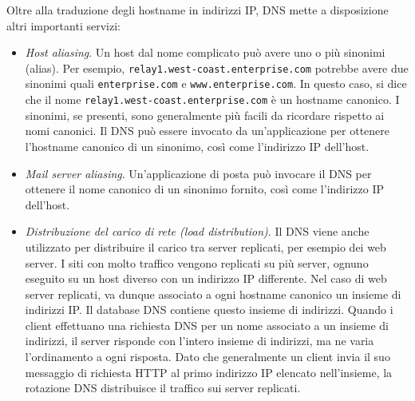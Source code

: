 Oltre alla traduzione degli hostname in indirizzi IP, DNS mette a disposizione altri
importanti servizi:
\begin{itemize}
    \item \textit{Host aliasing}. Un host dal nome complicato può avere uno o più sinonimi (alias). Per esempio, \verb|relay1.west-coast.enterprise.com| potrebbe avere due sinonimi quali \verb|enterprise.com| e \verb|www.enterprise.com|. In questo caso, si dice che il nome \verb|relay1.west-coast.enterprise.com| è un hostname canonico. I sinonimi, se presenti, sono generalmente più facili da ricordare rispetto ai nomi canonici. Il DNS può essere invocato da un'applicazione per ottenere l'hostname canonico di un sinonimo, così come l'indirizzo IP dell'host.
    \item \textit{Mail server aliasing}. Un'applicazione di posta può invocare il DNS per ottenere il nome canonico di un sinonimo fornito, così come l'indirizzo IP dell'host.
    \item \textit{Distribuzione del carico di rete (load distribution)}. Il DNS viene anche utilizzato per distribuire il carico tra server replicati, per esempio dei web server. I siti con molto traffico vengono replicati su più server, ognuno eseguito su un host diverso con un indirizzo IP differente. Nel caso di web server replicati, va dunque associato a ogni hostname canonico un insieme di indirizzi IP. Il database DNS contiene questo insieme di indirizzi. Quando i client effettuano una richiesta DNS per un nome associato a un insieme di indirizzi, il server risponde con l'intero insieme di indirizzi, ma ne varia l'ordinamento a ogni risposta. Dato che generalmente un client invia il suo messaggio di richiesta HTTP al primo indirizzo IP elencato nell'insieme, la rotazione DNS distribuisce il traffico sui server replicati.
\end{itemize}

